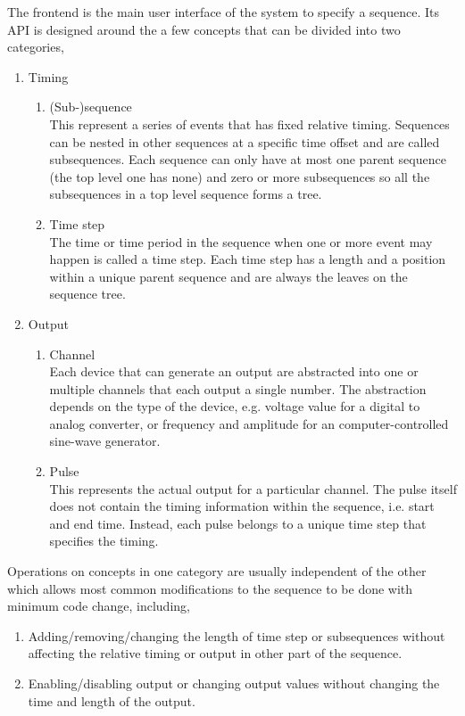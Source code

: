The frontend is the main user interface of the system to specify a sequence.
Its API is designed around the a few concepts that can be divided into two categories,
\begin{enumerate}
\item Timing
  \begin{enumerate}
  \item (Sub-)sequence\\
    This represent a series of events that has fixed relative timing.
    Sequences can be nested in other sequences at a specific time offset
    and are called subsequences.
    Each sequence can only have at most one parent sequence (the top level one has none)
    and zero or more subsequences so all the subsequences in a top level sequence forms a tree.
  \item Time step\\
    The time or time period in the sequence when one or more event may happen
    is called a time step.
    Each time step has a length and a position within a unique parent sequence
    and are always the leaves on the sequence tree.
  \end{enumerate}
\item Output
  \begin{enumerate}
  \item Channel\\
    Each device that can generate an output are abstracted into
    one or multiple channels that each output a single number.
    The abstraction depends on the type of the device,
    e.g. voltage value for a digital to analog converter,
    or frequency and amplitude for an computer-controlled sine-wave generator.
  \item Pulse\\
    This represents the actual output for a particular channel.
    The pulse itself does not contain the timing information within the sequence,
    i.e. start and end time.
    Instead, each pulse belongs to a unique time step that specifies the timing.
  \end{enumerate}
\end{enumerate}
Operations on concepts in one category are usually independent of the other
which allows most common modifications to the sequence to be done
with minimum code change, including,
\begin{enumerate}
\item Adding/removing/changing the length of time step or subsequences
  without affecting the relative timing or output in other part of the sequence.
\item Enabling/disabling output or changing output values
  without changing the time and length of the output.
\end{enumerate}

